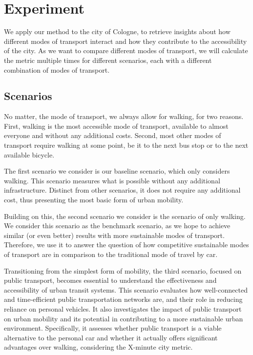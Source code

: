 \clearpage
\section{Experiment}
\label{sec:experiment}

We apply our method to the city of Cologne, to retrieve insights about how different modes of transport interact and how they contribute to the accessibility of the city.
As we want to compare different modes of transport, we will calculate the metric multiple times for different scenarios, each with a different combination of modes of transport.

\subsection{Scenarios}
\label{subs:scenarios}

No matter, the mode of transport, we always allow for walking, for two reasons.
First, walking is the most accessible mode of transport, available to almost everyone and without any additional costs.
Second, most other modes of transport require walking at some point, be it to the next bus stop or to the next available bicycle.

The first scenario we consider is our baseline scenario, which only considers walking.
This scenario measures what is possible without any additional infrastructure. 
Distinct from other scenarios, it does not require any additional cost, thus presenting the most basic form of urban mobility.

Building on this, the second scenario we consider is the scenario of only walking. 
We consider this scenario as the benchmark scenario, as we hope to achieve similar (or even better) results with more sustainable modes of transport.
Therefore, we use it to answer the question of how competitive sustainable modes of transport are in comparison to the traditional mode of travel by car. 

Transitioning from the simplest form of mobility, the third scenario, focused on public transport, becomes essential to understand the effectiveness and accessibility of urban transit systems. 
This scenario evaluates how well-connected and time-efficient public transportation networks are, and their role in reducing reliance on personal vehicles. 
It also investigates the impact of public transport on urban mobility and its potential in contributing to a more sustainable urban environment. 
Specifically, it assesses whether public transport is a viable alternative to the personal car and whether it actually offers significant advantages over walking, considering the X-minute city metric.

